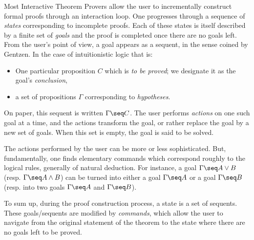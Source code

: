 
% 

% 



Most Interactive Theorem Provers allow the user to incrementally construct
formal proofs through an interaction loop. One progresses
through a sequence of {\em states} corresponding to incomplete proofs. Each
of these states is itself described by a finite set of {\em goals} and
the proof is completed once there are no goals left.
From the user's point of view, a goal appears as a sequent, in the
sense coined by Gentzen. In the case of intuitionistic logic that is:
\begin{itemize}
	\item One particular proposition $C$ which is {\em to be proved}; we
  designate it as the goal's {\em conclusion},
	\item a set of propositions $\Gamma$ corresponding to {\em hypotheses}.
\end{itemize}
On paper, this sequent is written $\Gamma\seq C$.  The user performs
{\em actions} on one such goal at a time, and the actions transform
the goal, or rather replace the goal by a new set of goals. When this
set is empty, the goal is said to be solved.

The actions performed by the user can be more or less
sophisticated. But, fundamentally, one finds elementary commands which
correspond roughly to the logical rules, generally of natural
deduction. For instance, a goal $\Gamma\seq A\vee B$
(resp. $\Gamma\seq A\wedge B$) can be turned into either a goal
$\Gamma\seq A$ or a goal $\Gamma\seq B$ (resp. into two goals
$\Gamma\seq A$ and $\Gamma\seq B$).

To sum up, during the proof construction process, a state is a set of
sequents. These goals/sequents are modified by {\em commands}, which
allow the user to navigate from the original statement of the theorem
to the state where there are no goals left to be proved.

